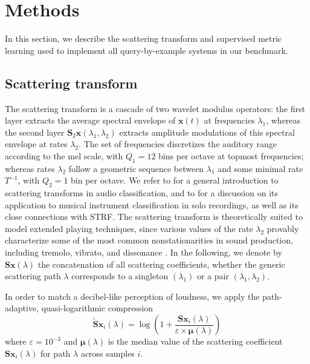 \documentclass{article}
\begin{document}


\section{Methods}

In this section, we describe the scattering transform and supervised metric learning used to implement all query-by-example systems in our benchmark.

\subsection{Scattering transform} %
The scattering transform is a cascade of two wavelet modulus operators:
the first layer extracts the average spectral envelope of $\boldsymbol{x}(t)$ at frequencies $\lambda_1$, whereas the second layer $\mathbf{S}_2 \boldsymbol{x} (\lambda_1, \lambda_2)$ extracts amplitude modulations of this spectral envelope at rates $\lambda_2$.
The set of frequencies discretizes the auditory range according to the mel scale, with $Q_1 = 12$ bins per octave at topmost frequencies; whereas rates $\lambda_2$ follow a geometric sequence between $\lambda_1$ and some minimal rate $T^{-1}$, with $Q_2 = 1$ bin per octave.
We refer to \cite{anden2014taslp} for a general introduction to scattering transforms in audio classification, and to \cite{lostanlen2017phd} for a discussion on its application to musical instrument classification in solo recordings, as well as its close connections with STRF. The scattering transform is theoretically suited to model extended playing techniques, since various values of the rate $\lambda_2$ provably characterize some of the most common nonstationarities in sound production, including tremolo, vibrato, and dissonance \cite{anden2012dafx}.
In the following, we denote by $\mathbf{S}\boldsymbol{x}(\lambda)$ the concatenation of all scattering coefficients, whether the generic scattering path $\lambda$ corresponds to a singleton $(\lambda_1)$ or a pair $(\lambda_1,\lambda_2)$.

In order to match a decibel-like perception of loudness, we apply the path-adaptive, quasi-logarithmic compression
\begin{equation}
\widetilde{\mathbf{S}} \boldsymbol{x}_i(\lambda) =
\log \left(
1 + \dfrac{\mathbf{S}\boldsymbol{x}_i(\lambda)}{\varepsilon \times \boldsymbol{\mu}(\lambda)}
\right)
\end{equation}
where $\varepsilon = 10^{-3}$ and $\boldsymbol{\mu}(\lambda)$ is the median value of the scattering coefficient $\mathbf{S}\boldsymbol{x}_i (\lambda)$ for path $\lambda$ across samples $i$.
\end{document}
